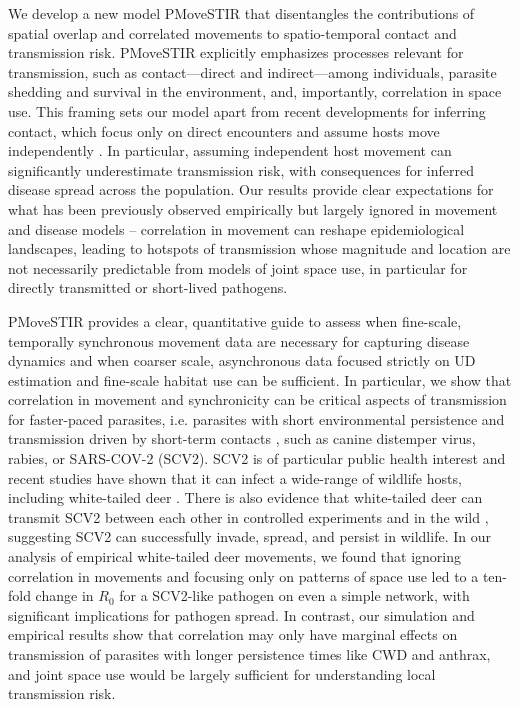 \documentclass[letterpaper]{article}
\begin{document}
We develop a new model PMoveSTIR that disentangles the contributions of spatial overlap and correlated movements to spatio-temporal contact and transmission risk.  PMoveSTIR explicitly emphasizes processes relevant for transmission, such as contact---direct and indirect---among individuals, parasite shedding and survival in the environment, and, importantly, correlation in space use. 
This framing sets our model apart from recent developments for inferring contact, which focus only on direct encounters and assume hosts move independently \citep{Noonan2021,Das2023}.  In particular, assuming independent host movement can significantly underestimate transmission risk, with consequences for inferred disease spread across the population. Our results provide clear expectations for what has been previously observed empirically but largely ignored in movement and disease models -- correlation in movement can reshape epidemiological landscapes, leading to hotspots of transmission whose magnitude and location are not necessarily predictable from models of joint space use, in particular for directly transmitted or short-lived pathogens.

PMoveSTIR provides a clear, quantitative guide to assess when fine-scale, temporally synchronous movement data are necessary for capturing disease dynamics and when coarser scale, asynchronous data focused strictly on UD estimation and fine-scale habitat use can be sufficient. 
In particular, we show that correlation in movement and synchronicity can be critical aspects of transmission for faster-paced parasites, i.e. parasites with short environmental persistence and transmission driven by short-term contacts \citep[cf.][]{Dougherty2018,Manlove2022}, such as canine distemper virus, rabies, or SARS-COV-2 (SCV2). 
SCV2 is of particular public health interest and recent studies have shown that it can infect a wide-range of wildlife hosts, including white-tailed deer \citep{Palmer2021,Hale2022}. There is also evidence that white-tailed deer can transmit SCV2 between each other in controlled experiments and in the wild \citep{Martins2022,Hale2022}, suggesting SCV2 can successfully invade, spread, and persist in wildlife.  In our analysis of empirical white-tailed deer movements, we found that ignoring correlation in movements and focusing only on patterns of space use led to a ten-fold change in $R_0$ for a SCV2-like pathogen on even a simple network, with significant implications for pathogen spread.  In contrast, our simulation and empirical results show that correlation may only have marginal effects on transmission of parasites with longer persistence times like CWD and anthrax, and joint space use would be largely sufficient for understanding local transmission risk.
\end{document}
